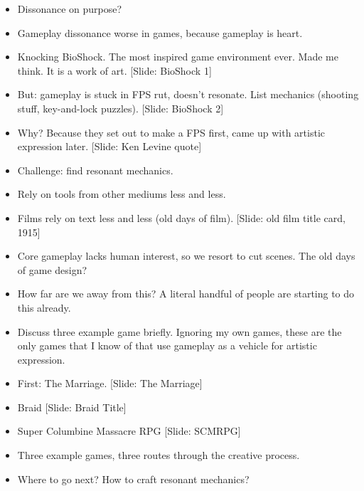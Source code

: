 \documentclass[12pt]{article}
\begin{document}
{\begin{itemize}
\item Dissonance on purpose?

\item Gameplay dissonance worse in games, because gameplay is heart.

\item Knocking BioShock.  The most inspired game environment ever.  Made me think.  It is a work of art. [Slide:  BioShock 1]

\item But: gameplay is stuck in FPS rut, doesn't resonate.  List mechanics (shooting stuff, key-and-lock puzzles).  [Slide: BioShock 2]

\item Why?  Because they set out to make a FPS first, came up with artistic expression later.  [Slide:  Ken Levine quote]

\item Challenge:  find resonant mechanics.

\item Rely on tools from other mediums less and less.

\item Films rely on text less and less (old days of film).  [Slide:  old film title card, 1915]
 
\item Core gameplay lacks human interest, so we resort to cut scenes.  The old days of game design?

\item  How far are we away from this?  A literal handful of people are starting to do this already.
 
\item Discuss three example game briefly.  Ignoring my own games, these are the only games that I know of that use gameplay as a vehicle for artistic expression. 
 
\item First:  The Marriage. [Slide:  The Marriage]

\item Braid [Slide: Braid Title]
 
\item Super Columbine Massacre RPG [Slide: SCMRPG]

\item Three example games, three routes through the creative process.
 
\item Where to go next?  How to craft resonant mechanics?
 

\end{itemize}}
\end{document}
